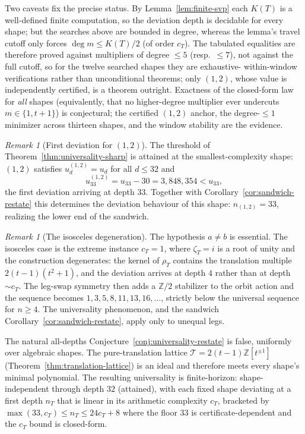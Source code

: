 \documentclass[11pt]{article}
\theoremstyle{plain}
\theoremstyle{definition}
\theoremstyle{remark}
\newtheorem{remark}[theorem]{Remark}
\begin{document}
Two caveats fix the precise status. By Lemma~\ref{lem:finite-svp} each $K(T)$ is
a well-defined finite computation, so the deviation depth is decidable for every
shape; but the searches above are bounded in degree, whereas the lemma's travel
cutoff only forces $\deg m \le K(T)/2$ (of order $c_T$). The tabulated equalities
are therefore proved against multipliers of degree $\le 5$ (resp.\ $\le 7$), not
against the full cutoff, so for the twelve searched shapes they are exhaustive-%
within-window verifications rather than unconditional theorems; only $(1,2)$,
whose value is independently certified, is a theorem outright. Exactness of the
closed-form law for \emph{all} shapes (equivalently, that no higher-degree
multiplier ever undercuts $m \in \{1, t+1\}$) is conjectural; the certified
$(1,2)$ anchor, the degree-$\le1$ minimizer across thirteen shapes, and the
window stability are the evidence.

\begin{remark}[First deviation for $(1,2)$]
\label{rem:first-deviation-12}
The threshold of Theorem~\ref{thm:universality-sharp} is attained at the
smallest-complexity shape: $(1,2)$ satisfies $u_d^{(1,2)} = u_d$ for all
$d \le 32$ and
\[
u_{33}^{(1,2)} = u_{33} - 30 = 3{,}848{,}354 < u_{33},
\]
the first deviation arriving at depth $33$. Together with
Corollary~\ref{cor:sandwich-restate} this determines the deviation
behaviour of this shape: $n_{(1,2)} = 33$, realizing the lower end of the
sandwich.
\end{remark}

\begin{remark}[The isosceles degeneration]
\label{rem:isosceles-degeneration}
The hypothesis $a \neq b$ is essential. The isosceles case is the extreme
instance $c_T = 1$, where $\zeta_T = i$ is a root of unity and the
construction degenerates: the kernel of $\rho_T$ contains the translation
multiple $2(t-1)(t^2+1)$, and the deviation arrives at depth $4$ rather
than at depth $\sim c_T$. The leg-swap symmetry then adds a
$\mathbb{Z}/2$ stabilizer to the orbit action and the sequence becomes
$1,3,5,8,11,13,16,\ldots$, strictly below the universal sequence for
$n \ge 4$. The universality phenomenon, and the sandwich
Corollary~\ref{cor:sandwich-restate}, apply only to unequal legs.
\end{remark}

The natural all-depths Conjecture~\ref{conj:universality-restate} is
false, uniformly over algebraic shapes. The pure-translation lattice
$\mathcal{T} = 2(t-1)\mathbb{Z}[t^{\pm 1}]$
(Theorem~\ref{thm:translation-lattice}) is an ideal and therefore meets
every shape's minimal polynomial. The resulting universality is
finite-horizon: shape-independent through depth $32$ (attained), with
each fixed shape deviating at a first depth $n_T$ that is linear in its
arithmetic complexity $c_T$, bracketed by
$\max(33,c_T) \le n_T \le 24c_T + 8$ where the floor $33$ is
certificate-dependent and the $c_T$ bound is closed-form.
\end{document}

